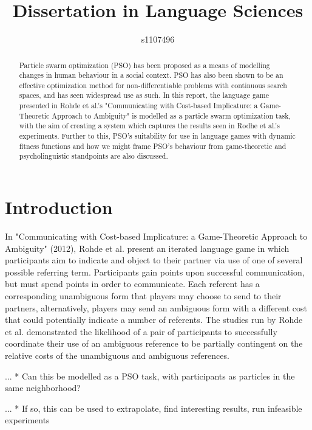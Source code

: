 \documentclass[12pt]{article}
\begin{document}
\title{Dissertation in Language Sciences}
\author{s1107496}

\maketitle

\begin{abstract}
Particle swarm optimization (PSO) has been proposed as a means of modelling changes in human behaviour in a social context. PSO has also been shown to be an effective optimization method for non-differentiable problems with continuous search spaces, and has seen widespread use as such. In this report, the language game presented in Rohde et al.'s "Communicating with Cost-based Implicature: a Game-Theoretic Approach to Ambiguity" is modelled as a particle swarm optimization task, with the aim of creating a system which captures the results seen in Rodhe et al.'s experiments. Further to this, PSO's suitability for use in language games with dynamic fitness functions and how we might frame PSO's behaviour from game-theoretic and psycholinguistic standpoints are also discussed.
\end{abstract}



\section{Introduction}
In "Communicating with Cost-based Implicature: a Game-Theoretic Approach to Ambiguity" (2012), Rohde et al. present an iterated language game in which participants aim to indicate and object to their partner via use of one of several possible referring term. Participants gain points upon successful communication, but must spend points in order to communicate. Each referent has a corresponding unambiguous form that players may choose to send to
their partners, alternatively, players may send an ambiguous form with a different cost that could potentially indicate a number of referents. The 
studies run by Rohde et al. demonstrated the likelihood of a pair of participants to successfully coordinate their use of an ambiguous reference to be partially contingent on the relative costs of the unambiguous and ambiguous references.

... * Can this be modelled as a PSO task, with participants as particles in the same neighborhood?

... * If so, this can be used to extrapolate, find interesting results, run infeasible experiments
\end{document}
